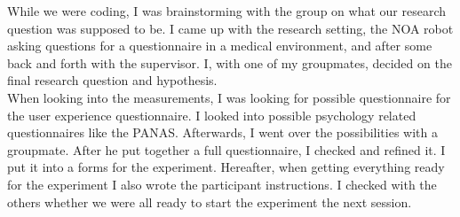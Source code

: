 \documentclass[runningheads]{llncs}
\begin{document}
While we were coding, I was brainstorming with the group on what our research question was supposed to be. I came up with the research setting, the NOA robot asking questions for a questionnaire in a medical environment, and after some back and forth with the supervisor. I, with one of my groupmates, decided on the final research question and hypothesis. \\

When looking into the measurements, I was looking for possible questionnaire for the user experience questionnaire. I looked into possible psychology related questionnaires like the PANAS. Afterwards, I went over the possibilities with a groupmate. After he put together a full questionnaire, I checked and refined it. I put it into a forms for the experiment. Hereafter, when getting everything ready for the experiment I also wrote the participant instructions. I checked with the others whether we were all ready to start the experiment the next session.\\
\end{document}
